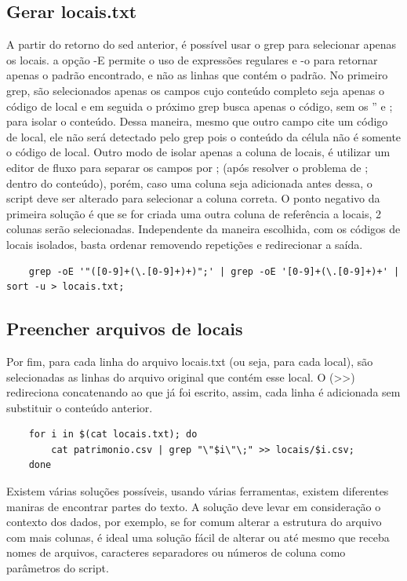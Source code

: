 \documentclass[oneside, 11 pt]{article}
\begin{document}
	\subsection{Gerar locais.txt}
	A partir do retorno do sed anterior, é possível usar o grep para selecionar apenas os locais. a opção -E permite o uso de expressões regulares e -o para retornar apenas o padrão encontrado, e não as linhas que contém o padrão. No primeiro grep, são selecionados apenas os campos cujo conteúdo completo seja apenas o código de local e em seguida o próximo grep busca apenas o código, sem os '' e ; para isolar o conteúdo. Dessa maneira, mesmo que outro campo cite um código de local, ele não será detectado pelo grep pois o conteúdo da célula não é somente o código de local. Outro modo de isolar apenas a coluna de locais, é utilizar um editor de fluxo para separar os campos por ; (após resolver o problema de ; dentro do conteúdo), porém, caso uma coluna seja adicionada antes dessa, o script deve ser alterado para selecionar a coluna correta. O ponto negativo da primeira solução é que se for criada uma outra coluna de referência a locais, 2 colunas serão selecionadas.
	Independente da maneira escolhida, com os códigos de locais isolados, basta ordenar removendo repetições e redirecionar a saída.
	\begin{lstlisting}
	grep -oE '"([0-9]+(\.[0-9]+)+)";' | grep -oE '[0-9]+(\.[0-9]+)+' | sort -u > locais.txt;
	\end{lstlisting}
	
	\subsection{Preencher arquivos de locais}
	Por fim, para cada linha do arquivo locais.txt (ou seja, para cada local), são selecionadas as linhas do arquivo original que contém esse local. O (>>) redireciona concatenando ao que já foi escrito, assim, cada linha é adicionada sem substituir o conteúdo anterior.
	\begin{lstlisting}
	for i in $(cat locais.txt); do
		cat patrimonio.csv | grep "\"$i\"\;" >> locais/$i.csv;
	done
	\end{lstlisting}

	Existem várias soluções possíveis, usando várias ferramentas, existem diferentes maniras de encontrar partes do texto. A solução deve levar em consideração o contexto dos dados, por exemplo, se for comum alterar a estrutura do arquivo com mais colunas, é ideal uma solução fácil de alterar ou até mesmo que receba nomes de arquivos, caracteres separadores ou números de coluna como parâmetros do script.
	
\end{document}
